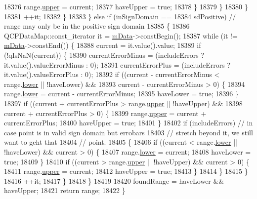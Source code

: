 \begin{DoxyCode}
18376             range.\hyperlink{class_q_c_p_range_ae44eb3aafe1d0e2ed34b499b6d2e074f}{upper} = current;
18377             haveUpper = \textcolor{keyword}{true};
18378           \}
18379         \}
18380       \}
18381       ++it;
18382     \}
18383   \} \textcolor{keywordflow}{else} \textcolor{keywordflow}{if} (inSignDomain ==
18384              \hyperlink{class_q_c_p_abstract_plottable_a661743478a1d3c09d28ec2711d7653d8a02951859f243a4d24e779cfbb5471030}{sdPositive}) \textcolor{comment}{// range may only be in the positive sign domain}
18385   \{
18386     QCPDataMap::const\_iterator it = \hyperlink{class_q_c_p_graph_a8457c840f69a0ac49f61d30a509c5d08}{mData}->constBegin();
18387     \textcolor{keywordflow}{while} (it != \hyperlink{class_q_c_p_graph_a8457c840f69a0ac49f61d30a509c5d08}{mData}->constEnd()) \{
18388       current = it.value().value;
18389       \textcolor{keywordflow}{if} (!qIsNaN(current)) \{
18390         currentErrorMinus = (includeErrors ? it.value().valueErrorMinus : 0);
18391         currentErrorPlus = (includeErrors ? it.value().valueErrorPlus : 0);
18392         \textcolor{keywordflow}{if} ((current - currentErrorMinus < range.\hyperlink{class_q_c_p_range_aa3aca3edb14f7ca0c85d912647b91745}{lower} || !haveLower) &&
18393             current - currentErrorMinus > 0) \{
18394           range.\hyperlink{class_q_c_p_range_aa3aca3edb14f7ca0c85d912647b91745}{lower} = current - currentErrorMinus;
18395           haveLower = \textcolor{keyword}{true};
18396         \}
18397         \textcolor{keywordflow}{if} ((current + currentErrorPlus > range.\hyperlink{class_q_c_p_range_ae44eb3aafe1d0e2ed34b499b6d2e074f}{upper} || !haveUpper) &&
18398             current + currentErrorPlus > 0) \{
18399           range.\hyperlink{class_q_c_p_range_ae44eb3aafe1d0e2ed34b499b6d2e074f}{upper} = current + currentErrorPlus;
18400           haveUpper = \textcolor{keyword}{true};
18401         \}
18402         \textcolor{keywordflow}{if} (includeErrors) \textcolor{comment}{// in case point is in valid sign domain but errobars}
18403                            \textcolor{comment}{// stretch beyond it, we still want to geht that}
18404                            \textcolor{comment}{// point.}
18405         \{
18406           \textcolor{keywordflow}{if} ((current < range.\hyperlink{class_q_c_p_range_aa3aca3edb14f7ca0c85d912647b91745}{lower} || !haveLower) && current > 0) \{
18407             range.\hyperlink{class_q_c_p_range_aa3aca3edb14f7ca0c85d912647b91745}{lower} = current;
18408             haveLower = \textcolor{keyword}{true};
18409           \}
18410           \textcolor{keywordflow}{if} ((current > range.\hyperlink{class_q_c_p_range_ae44eb3aafe1d0e2ed34b499b6d2e074f}{upper} || !haveUpper) && current > 0) \{
18411             range.\hyperlink{class_q_c_p_range_ae44eb3aafe1d0e2ed34b499b6d2e074f}{upper} = current;
18412             haveUpper = \textcolor{keyword}{true};
18413           \}
18414         \}
18415       \}
18416       ++it;
18417     \}
18418   \}
18419 
18420   foundRange = haveLower && haveUpper;
18421   \textcolor{keywordflow}{return} range;
18422 \}
\end{DoxyCode}
